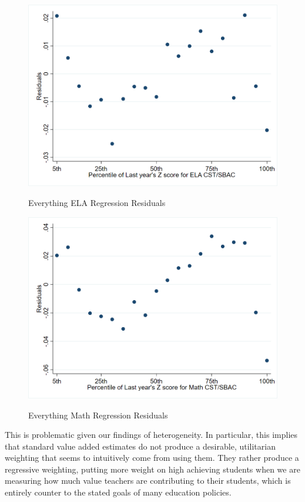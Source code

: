 \documentclass[letterpaper,12pt]{article}
\begin{document}
\begin{figure}[ht]
    \centering
    \caption{Everything ELA Regression Residuals}
    \includegraphics[width=\textwidth]{figures/ELA_Resid_Everything.png}
    \label{fig: ELA resid Everything}
\end{figure}

\begin{figure}[ht]
    \centering
    \caption{Everything Math Regression Residuals}
    \includegraphics[width=\textwidth]{figures/Math_Resid_Everything.png}
    \label{fig: Math resid Everything}
\end{figure}

This is problematic given our findings of heterogeneity. In particular, this implies that standard value added estimates do not produce a desirable, utilitarian weighting that seems to intuitively come from using them. They rather produce a regressive weighting, putting more weight on high achieving students when we are measuring how much value teachers are contributing to their students, which is entirely counter to the stated goals of many education policies.
\end{document}
